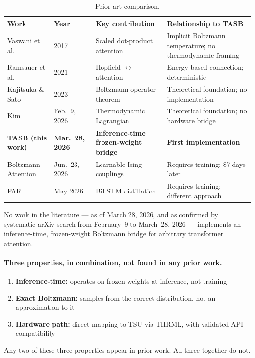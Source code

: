 \documentclass[11pt,a4paper]{article}
\begin{document}
\begin{table}[h]
\centering
\caption{Prior art comparison.}
\label{tab:prior_art}
\begin{tabular}{@{}llp{5cm}l@{}}
\toprule
Work & Year & Key contribution & Relationship to TASB \\
\midrule
Vaswani et al.~\citep{vaswani2017attention} & 2017 & Scaled dot-product attention & Implicit Boltzmann temperature; no thermodynamic framing \\
Ramsauer et al.~\citep{ramsauer2021hopfield} & 2021 & Hopfield $\leftrightarrow$ attention & Energy-based connection; deterministic \\
Kajitsuka \& Sato~\citep{kajitsuka2024transformers} & 2023 & Boltzmann operator theorem & Theoretical foundation; no implementation \\
Kim~\citep{kim2026thermodynamic} & Feb.\ 9, 2026 & Thermodynamic Lagrangian & Theoretical foundation; no hardware bridge \\
\textbf{TASB (this work)} & \textbf{Mar.\ 28, 2026} & \textbf{Inference-time frozen-weight bridge} & \textbf{First implementation} \\
Boltzmann Attention~\citep{boltzmann_attention2026} & Jun.\ 23, 2026 & Learnable Ising couplings & Requires training; 87 days later \\
FAR~\citep{far2026} & May 2026 & BiLSTM distillation & Requires training; different approach \\
\bottomrule
\end{tabular}
\end{table}

No work in the literature --- as of March 28, 2026, and
as confirmed by systematic arXiv search from February~9 to March~28, 2026 ---
implements an inference-time, frozen-weight Boltzmann bridge for arbitrary
transformer attention.

\paragraph{Three properties, in combination, not found in any prior work.}
\begin{enumerate}[nosep]
  \item \textbf{Inference-time:} operates on frozen weights at inference, not training
  \item \textbf{Exact Boltzmann:} samples from the correct distribution, not an approximation to it
  \item \textbf{Hardware path:} direct mapping to TSU via THRML, with validated API compatibility
\end{enumerate}
Any two of these three properties appear in prior work. All three together do not.
\end{document}
